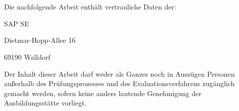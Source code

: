 \chapter*{}
Die nachfolgende Arbeit enthält vertrauliche Daten der:

\vspace{0.5cm}

	SAP SE
	
	Dietmar-Hopp-Allee 16
	
	69190 Walldorf
	
\vspace{0.5cm}
Der Inhalt dieser Arbeit darf weder als Ganzes noch in Auszügen Personen außerhalb des Prüfungsprozesses und des Evaluationsverfahrens zugänglich gemacht werden, sofern keine anders lautende Genehmigung der Ausbildungsstätte vorliegt. 
\cleardoublepage

